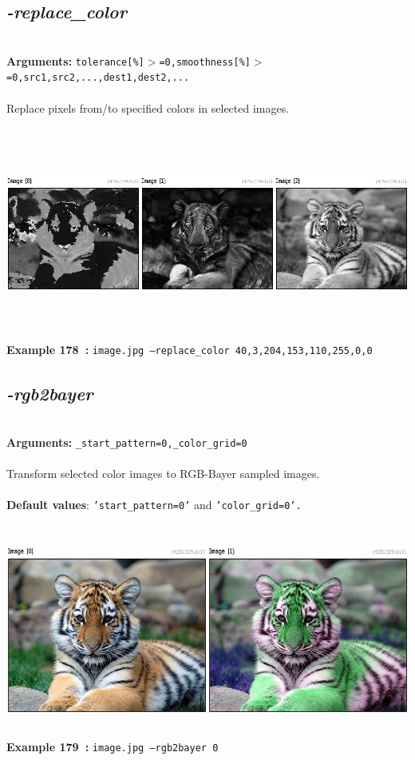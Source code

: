 \documentclass[a4paper,11pt,twoside]{book}
\begin{document}
\subsection{\emph{-replace\_color} }\vspace*{-0.5em}
~\\\textbf{Arguments: } 
{\small \texttt{tolerance[\%]$>$=0,smoothness[\%]$>$=0,src1,src2,...,dest1,dest2,...}}\\~\\
Replace pixels from/to specified colors in selected images.
\begin{center}\includegraphics[keepaspectratio=true,height=7cm,width=\textwidth]{img/gmic_def178.jpg}\\
{\footnotesize \textbf{Example 178~:} \texttt{image.jpg --replace\_color 40,3,204,153,110,255,0,0}}
\end{center}

\subsection{\emph{-rgb2bayer} }\vspace*{-0.5em}
~\\\textbf{Arguments: } 
{\small \texttt{\_start\_pattern=0,\_color\_grid=0}}\\~\\
Transform selected color images to RGB-Bayer sampled images.
~\\~\\\textbf{Default values}: {\small \texttt{'start\_pattern=0'} and \texttt{'color\_grid=0'.}}
\begin{center}\includegraphics[keepaspectratio=true,height=7cm,width=\textwidth]{img/gmic_def179.jpg}\\
{\footnotesize \textbf{Example 179~:} \texttt{image.jpg --rgb2bayer 0}}
\end{center}
\end{document}
